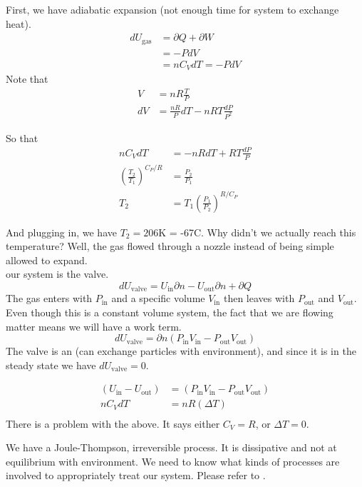\documentclass[12pt]{article}
\begin{document}
First, we have adiabatic expansion (not enough time for system to exchange heat).
\begin{align*}
dU_\text{gas} &= \partial Q + \partial W\\
&= -P dV\\
&= n C_V dT = -P dV
\end{align*}
Note that
\begin{align*}
V &= nR\frac{T}{P}\\
dV &= \frac{n R}{P} dT - nRT \frac{dP}{P^2}
\end{align*}

So that
\begin{align*}
nC_V dT &= -nRdT + RT \frac{dP}{P}\\
(\frac{T_2}{T_1})^{C_P/ R} &= \frac{P_2}{P_1}\\
T_2 &= T_1 (\frac{P_1}{P_2})^{R/C_P}
\end{align*}

And plugging in, we have $T_2 = 206$K = -67\degree C.  Why didn't we actually reach this temperature?  Well, the gas flowed through a nozzle instead of being simple allowed to expand.\\

   our system is the valve.  
\begin{equation}
dU_\text{valve} = U_\text{in} \partial n - U_\text{out} \partial n + \partial Q
\end{equation}
The gas enters with $P_\text{in}$ and a specific volume $V_\text{in}$ then leaves with $P_\text{out}$ and $V_\text{out}$.  Even though this is a constant volume system, the fact that we are flowing matter means we will have a work term.
\begin{equation}
dU_\text{valve} = \partial n (P_\text{in} V_\text{in} - P_\text{out} V_\text{out})
\end{equation}
The valve is an  (can exchange particles with environment), and since it is in the steady state we have $dU_\text{valve} = 0$.

\begin{align*}
(U_\text{in} - U_\text{out}) &= (P_\text{in} V_\text{in} - P_\text{out} V_\text{out})\\
n C_V dT &= nR(\Delta T)\\
\end{align*}
There is a problem with the above.  It says either $C_V = R$, or $\boxed{\Delta T=0}$.

We have a Joule-Thompson, irreversible process.  It is dissipative and not at equilibrium with environment.
We need to know what kinds of processes are involved to appropriately treat our system.  Please refer to .
\end{document}
